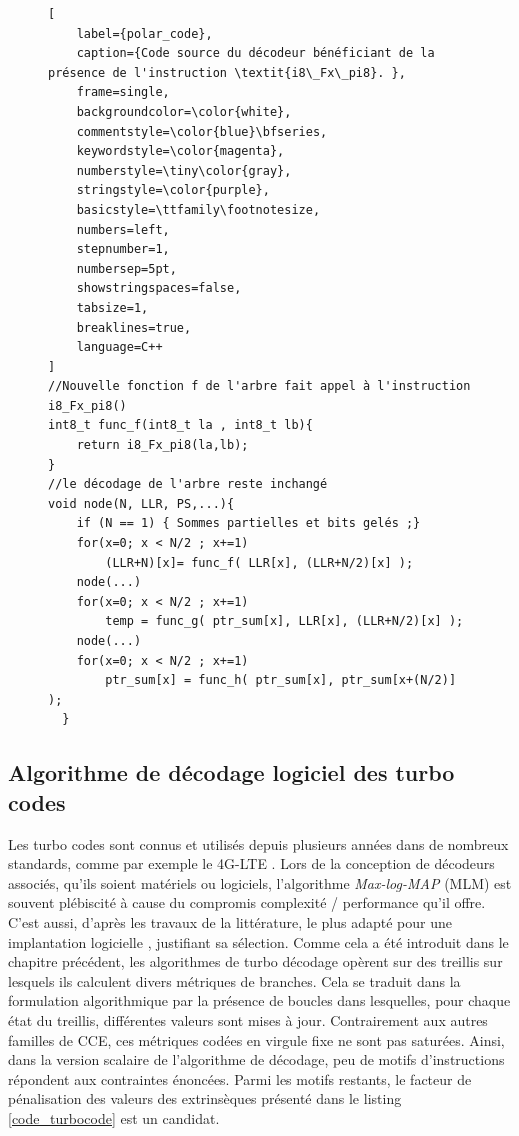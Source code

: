 \documentclass[../main.tex]{subfiles}
\begin{document}
\begin{figure}[!tb]
\begin{lstlisting}[
    label={polar_code},
    caption={Code source du décodeur bénéficiant de la présence de l'instruction \textit{i8\_Fx\_pi8}. },
    frame=single,
    backgroundcolor=\color{white},  
    commentstyle=\color{blue}\bfseries,
    keywordstyle=\color{magenta},
    numberstyle=\tiny\color{gray},
    stringstyle=\color{purple},
    basicstyle=\ttfamily\footnotesize,
    numbers=left,
    stepnumber=1,
    numbersep=5pt,                 
    showstringspaces=false,
    tabsize=1,
    breaklines=true,
    language=C++
]
//Nouvelle fonction f de l'arbre fait appel à l'instruction i8_Fx_pi8()
int8_t func_f(int8_t la , int8_t lb){
    return i8_Fx_pi8(la,lb);
}
//le décodage de l'arbre reste inchangé
void node(N, LLR, PS,...){
    if (N == 1) { Sommes partielles et bits gelés ;}
    for(x=0; x < N/2 ; x+=1)
        (LLR+N)[x]= func_f( LLR[x], (LLR+N/2)[x] );
    node(...)
    for(x=0; x < N/2 ; x+=1)
        temp = func_g( ptr_sum[x], LLR[x], (LLR+N/2)[x] );
    node(...)
    for(x=0; x < N/2 ; x+=1)
        ptr_sum[x] = func_h( ptr_sum[x], ptr_sum[x+(N/2)] );
  }
\end{lstlisting}
\end{figure}

%
%
%
%
%
%
%
%
\subsection{Algorithme de décodage logiciel des turbo codes}
%
%
%
%
Les turbo codes \cite{NearShanon,Wei18} sont connus et utilisés depuis plusieurs années dans de nombreux standards, comme par exemple le 4G-LTE \cite{Ref_4G}. Lors de la conception de décodeurs associés, qu'ils soient matériels ou logiciels, l'algorithme \textit{Max-log-MAP} (MLM) est souvent plébiscité à cause du compromis complexité / performance qu'il offre. C'est aussi, d'après les travaux de la littérature, le plus adapté pour une implantation logicielle \cite{ri:LeG19c}, justifiant sa sélection. Comme cela a été introduit dans le chapitre précédent, les algorithmes de turbo décodage opèrent sur des treillis sur lesquels ils calculent divers métriques de branches. Cela se traduit dans la formulation algorithmique par la présence de boucles dans lesquelles, pour chaque état du treillis, différentes valeurs sont mises à jour. Contrairement aux autres familles de CCE, ces métriques codées en virgule fixe ne sont pas saturées. 
Ainsi, dans la version scalaire de l'algorithme de décodage, peu de motifs d'instructions répondent aux contraintes énoncées. Parmi les motifs restants, le facteur de pénalisation des valeurs des extrinsèques présenté dans le listing \ref{code_turbocode} est un candidat.
\end{document}
